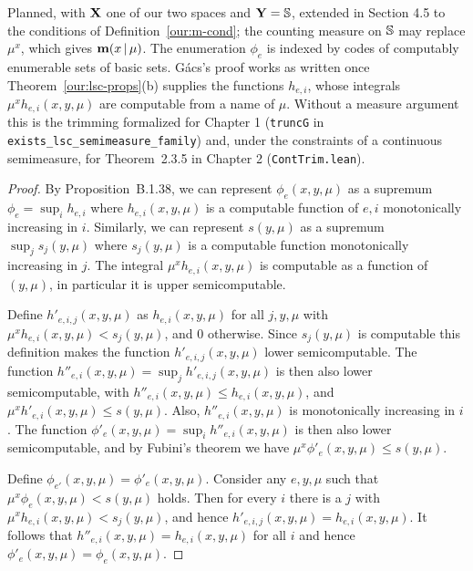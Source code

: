 \begin{formalization}
Planned, with $\mathbf{X}$ one of our two spaces and $\mathbf{Y} = \mathbb{S}$, extended in Section 4.5 to the
conditions of Definition~\ref{our:m-cond}; the counting measure on $\mathbb{S}$ may replace $\mu^{x}$,
which gives $\mathbf{m}(x \,\vert\, \mu)$. The enumeration $\phi_{e}$ is indexed by codes of computably
enumerable sets of basic sets. G\'acs's proof works as written once Theorem~\ref{our:lsc-props}(b)
supplies the functions $h_{e,i}$, whose integrals $\mu^{x}h_{e,i}(x,y,\mu)$ are computable from a
name of $\mu$. Without a measure argument this is
the trimming formalized for Chapter 1 (\texttt{truncG} in
\texttt{exists\_lsc\_semimeasure\_family}) and, under the constraints of a continuous
semimeasure, for Theorem~2.3.5 in Chapter 2 (\texttt{ContTrim.lean}).
\end{formalization}
 \begin{proof}
By Proposition~B.1.38, we can represent \( \phi_{e}(x,y,\mu) \) 
as a supremum 
\( \phi_{e}=\sup_{i}h_{e,i} \) where \( h_{e,i}(x,y,\mu) \) is a computable function of
\( e,i \) monotonically increasing in \( i \).
Similarly, we can represent \( s(y,\mu) \) as a supremum \( \sup_{j}s_{j}(y,\mu) \)
where \( s_{j}(y,\mu) \) is a computable function monotonically increasing in \( j \).
The integral \( \mu^{x} h_{e,i}(x,y,\mu) \) is computable as a function of \( (y,\mu) \),
in particular it is upper semicomputable.

Define \( h'_{e,i,j}(x,y,\mu) \) as \( h_{e,i}(x,y,\mu) \) for all \( j,y,\mu \)
with \( \mu^{x} h_{e,i}(x,y,\mu)<s_{j}(y,\mu) \), and 0 otherwise.
Since \( s_{j}(y,\mu) \) is computable this 
definition makes the function \( h'_{e,i,j}(x,y,\mu) \) lower semicomputable.
The function \( h''_{e,i}(x,y,\mu)=\sup_{j}h'_{e,i,j}(x,y,\mu) \) is then also lower
semicomputable, with \( h''_{e,i}(x,y,\mu)\le h_{e,i}(x,y,\mu) \),
and \( \mu^{x} h'_{e,i}(x,y,\mu)\le s(y,\mu) \).
Also, \( h''_{e,i}(x,y,\mu) \) is monotonically increasing in \( i \).
The function \( \phi'_{e}(x,y,\mu)=\sup_{i}h''_{e,i}(x,y,\mu) \) is then also lower
semicomputable, and by Fubini's theorem we have
\( \mu^{x}\phi'_{e}(x,y,\mu)\le s(y,\mu) \).

Define \( \phi_{e'}(x,y,\mu)=\phi'_{e}(x,y,\mu) \).
Consider any \( e,y,\mu \) such that \( \mu^{x}\phi_{e}(x,y,\mu)<s(y,\mu) \) holds.
Then for every \( i \) there is a \( j \) with \( \mu^{x}h_{e,i}(x,y,\mu)<s_{j}(y,\mu) \),
and hence \( h'_{e,i,j}(x,y,\mu)=h_{e,i}(x,y,\mu) \).
It follows that \( h''_{e,i}(x,y,\mu)=h_{e,i}(x,y,\mu) \) for all \( i \) and hence
\( \phi'_{e}(x,y,\mu)=\phi_{e}(x,y,\mu) \).
 \end{proof}

